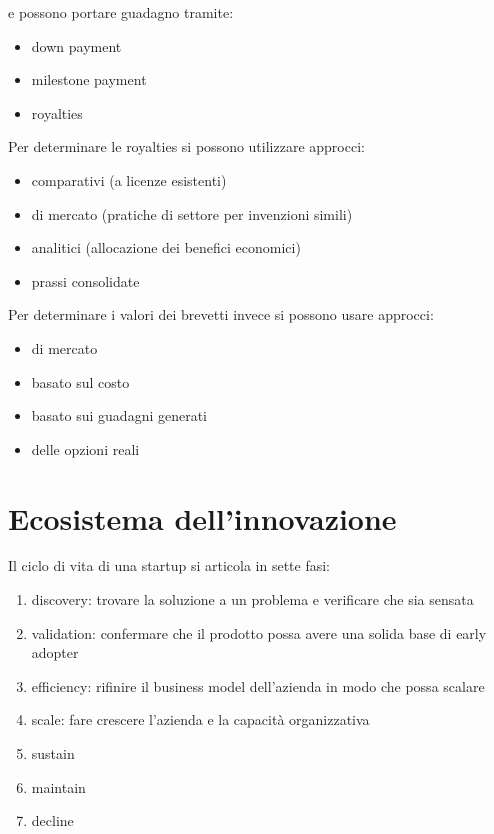 \documentclass[answers, a4paper, 11pt]{exam}
\begin{document}
e possono portare guadagno tramite:

\begin{itemize}
    \item down payment
    \item milestone payment
    \item royalties
\end{itemize}

Per determinare le royalties si possono utilizzare approcci:

\begin{itemize}
    \item comparativi (a licenze esistenti)
    \item di mercato (pratiche di settore per invenzioni simili)
    \item analitici (allocazione dei benefici economici)
    \item prassi consolidate
\end{itemize}

Per determinare i valori dei brevetti invece si possono usare approcci:

\begin{itemize}
    \item di mercato
    \item basato sul costo 
    \item basato sui guadagni generati
    \item delle opzioni reali
\end{itemize}

\section{Ecosistema dell'innovazione}

Il ciclo di vita di una startup si articola in sette fasi:

\begin{enumerate}
    \item discovery: trovare la soluzione a un problema e verificare che sia sensata
    \item validation: confermare che il prodotto possa avere una solida base di early adopter
    \item efficiency: rifinire il business model dell'azienda in modo che possa scalare
    \item scale: fare crescere l'azienda e la capacità organizzativa
    \item sustain
    \item maintain
    \item decline
\end{enumerate}
\end{document}
